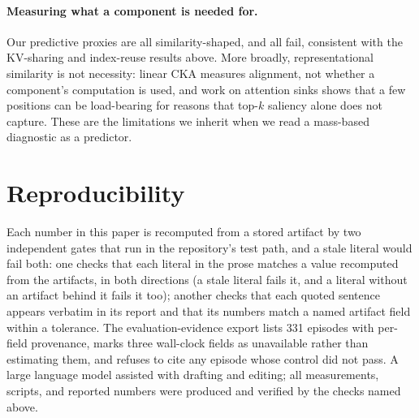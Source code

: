 \documentclass[10pt]{article}
\begin{document}
\paragraph{Measuring what a component is needed for.} Our predictive proxies
are all similarity-shaped, and all fail, consistent with the KV-sharing and
index-reuse results above. More broadly, representational similarity is not
necessity: linear CKA \citep{cka} measures alignment, not whether a component's
computation is used, and work on attention sinks \citep{streamingllm} shows
that a few positions can be load-bearing for reasons that top-$k$ saliency
alone does not capture. These are the limitations we inherit when we read a
mass-based diagnostic as a predictor.

\section{Reproducibility}

Each number in this paper is recomputed from a stored artifact by two
independent gates that run in the repository's test path, and a stale literal
would fail both: one checks that
each literal in the prose matches a value recomputed from the artifacts, in
both directions (a stale literal fails it, and a literal without an artifact
behind it fails it too);
another checks that each quoted sentence appears verbatim in its report and
that its numbers match a named artifact field within a tolerance. The
evaluation-evidence export lists 331 episodes with per-field provenance,
marks three wall-clock fields as unavailable rather than estimating them,
and refuses to cite any episode whose control did not pass. A large language
model assisted with drafting and editing; all measurements, scripts,
and reported numbers were produced and verified by the checks named above.



\end{document}
